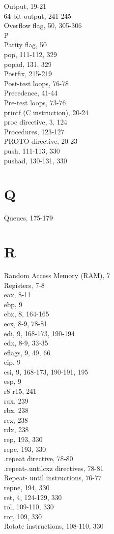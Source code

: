 \documentclass[10pt]{article}
\begin{document}
Output, 19-21\\
64-bit output, 241-245\\
Overflow flag, 50, 305-306\\
P\\
Parity flag, 50\\
pop, 111-112, 329\\
popad, 131, 329\\
Postfix, 215-219\\
Post-test loops, 76-78\\
Precedence, 41-44\\
Pre-test loops, 73-76\\
printf (C instruction), 20-24\\
proc directive, 3, 124\\
Procedures, 123-127\\
PROTO directive, 20-23\\
push, 111-113, 330\\
pushad, 130-131, 330

\section*{Q}
Queues, 175-179

\section*{R}
Random Access Memory (RAM), 7\\
Registers, 7-8\\
eax, 8-11\\
ebp, 9\\
ebx, 8, 164-165\\
ecx, 8-9, 78-81\\
edi, 9, 168-173, 190-194\\
edx, 8-9, 33-35\\
eflags, 9, 49, 66\\
eip, 9\\
esi, 9, 168-173, 190-191, 195\\
esp, 9\\
r8-r15, 241\\
rax, 239\\
rbx, 238\\
rcx, 238\\
rdx, 238\\
rep, 193, 330\\
repe, 193, 330\\
.repeat directive, 78-80\\
.repeat-.untilcxz directives, 78-81\\
Repeat- until instructions, 76-77\\
repne, 194, 330\\
ret, 4, 124-129, 330\\
rol, 109-110, 330\\
ror, 109, 330\\
Rotate instructions, 108-110, 330
\end{document}
